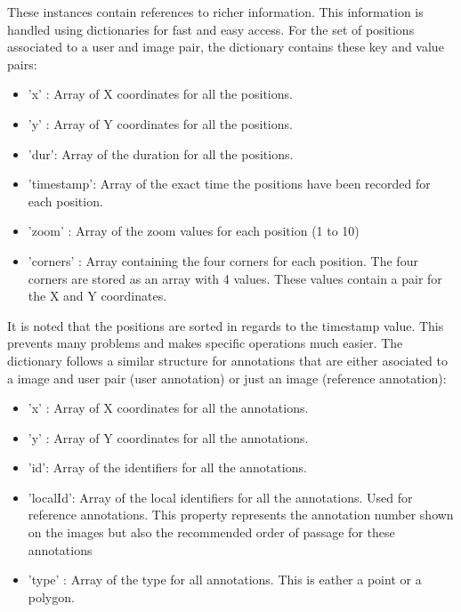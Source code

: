 \documentclass[a4paper,11pt]{report}
\numberwithin{figure}{section} %
\begin{document}
    These instances contain references to richer information. This information is handled using dictionaries for fast and easy access.
    For the set of positions associated to a user and image pair, the dictionary contains these key and value pairs:
    \begin{itemize}
        \item[\textbullet] 'x' : Array of X coordinates for all the positions.
        \item[\textbullet] 'y' : Array of Y coordinates for all the positions.
        \item[\textbullet] 'dur': Array of the duration for all the positions.
        \item[\textbullet] 'timestamp': Array of the exact time the positions have been recorded for each position.
        \item[\textbullet] 'zoom' : Array of the zoom values for each position (1 to 10)
        \item[\textbullet] 'corners' : Array containing the four corners for each position. The four corners are stored as an array with 4 values. These values contain a pair for the X and Y coordinates.
    \end{itemize}

    It is noted that the positions are sorted in regards to the timestamp value. This prevents many problems and makes specific operations much easier. The dictionary follows a similar structure for annotations that are either asociated to a image and user pair (user annotation) or just an image (reference annotation):
    \begin{itemize}
        \item[\textbullet] 'x' : Array of X coordinates for all the annotations.
        \item[\textbullet] 'y' : Array of Y coordinates for all the annotations.
        \item[\textbullet] 'id': Array of the identifiers for all the annotations.
        \item[\textbullet] 'localId': Array of the local identifiers for all the annotations. Used for reference annotations. This property represents the annotation number shown on the images but also the recommended order of passage for these annotations
        \item[\textbullet] 'type' : Array of the type for all annotations. This is eather a point or a polygon.
    \end{itemize}
\end{document}
